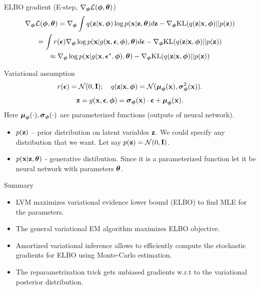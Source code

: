 \begin{frame}{ELBO gradient (E-step, $\nabla_{\boldsymbol{\phi}} \mathcal{L}(\boldsymbol{\phi}, \boldsymbol{\theta})$)}
	\vspace{-0.5cm}
	\begin{multline*}
		\nabla_{\boldsymbol{\phi}} \mathcal{L} (\boldsymbol{\phi}, \boldsymbol{\theta}) = \nabla_{\boldsymbol{\phi}}\int q(\mathbf{z}|\mathbf{x}, \boldsymbol{\phi}) \log p(\mathbf{x}| \mathbf{z}, \boldsymbol{\theta})  d\mathbf{z} - \nabla_{\boldsymbol{\phi}} \text{KL}(q(\mathbf{z} | \mathbf{x}, \boldsymbol{\phi}) || p(\mathbf{z}))
		\\ = \int r(\boldsymbol{\epsilon}) \nabla_{\boldsymbol{\phi}} \log p(\mathbf{x} | g(\mathbf{x}, \boldsymbol{\epsilon}, \boldsymbol{\phi}), \boldsymbol{\theta}) d\boldsymbol{\epsilon}  - \nabla_{\boldsymbol{\phi}} \text{KL}(q(\mathbf{z} | \mathbf{x}, \boldsymbol{\phi}) || p(\mathbf{z}))
		\\ \approx \nabla_{\boldsymbol{\phi}} \log p(\mathbf{x} | g(\mathbf{x}, \boldsymbol{\epsilon}^*, \boldsymbol{\phi}), \boldsymbol{\theta})  - \nabla_{\boldsymbol{\phi}} \text{KL}(q(\mathbf{z} | \mathbf{x}, \boldsymbol{\phi}) || p(\mathbf{z}))
	\end{multline*}
	\vspace{-0.5cm}
	\begin{block}{Variational assumption}
		\vspace{-0.3cm}
		\[
		r(\boldsymbol{\epsilon}) = \mathcal{N}(0, \mathbf{I}); \quad  q(\mathbf{z}| \mathbf{x}, \boldsymbol{\phi}) = \mathcal{N} (\boldsymbol{\mu}_{\boldsymbol{\phi}}(\mathbf{x}), \boldsymbol{\sigma}^2_{\boldsymbol{\phi}}(\mathbf{x})).
		\]
		\[
		\mathbf{z} = g(\mathbf{x}, \boldsymbol{\epsilon}, \boldsymbol{\phi}) = \boldsymbol{\sigma}_{\boldsymbol{\phi}}(\mathbf{x}) \cdot \boldsymbol{\epsilon} + \boldsymbol{\mu}_{\boldsymbol{\phi}}(\mathbf{x}).
		\]
		Here $\boldsymbol{\mu}_{\boldsymbol{\phi}}(\cdot), \boldsymbol{\sigma}_{\boldsymbol{\phi}}(\cdot)$ are parameterized functions (outputs of neural network).
	\end{block}
	\begin{itemize}
		\item $p(\mathbf{z})$ -- prior distribution on latent variables $\mathbf{z}$. We could specify any distribution that we want. Let say $p(\mathbf{z}) = \mathcal{N} (0, \mathbf{I})$.
		\item $p(\mathbf{x} | \mathbf{z}, \boldsymbol{\theta})$ - generative distibution. Since it is a parameterized function let it be neural network with parameters $\boldsymbol{\theta}$.
	\end{itemize}
\end{frame}
\begin{frame}{Summary}
	\begin{itemize}
		\item LVM maximizes variational evidence lower bound (ELBO) to find MLE for the parameters.
		\vfill
		\item The general variational EM algorithm maximizes ELBO objective.
		\vfill
		\item Amortized variational inference allows to efficiently compute the stochastic gradients for ELBO using Monte-Carlo estimation.
		\vfill
		\item The reparametrization trick gets unbiased gradients w.r.t to the variational posterior distribution.
	\end{itemize}
\end{frame}
 